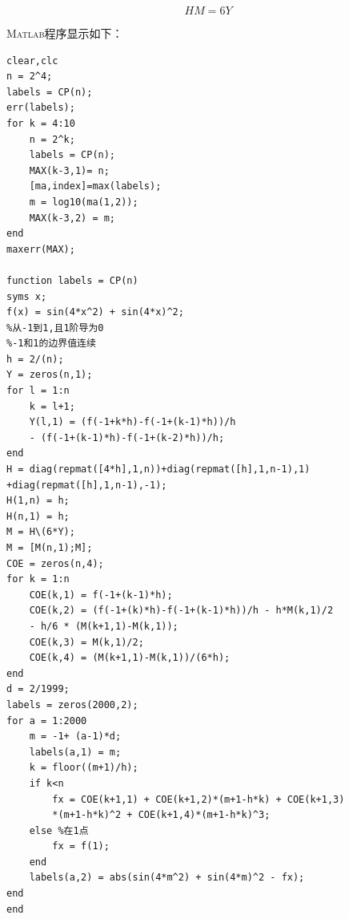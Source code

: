\documentclass[12pt,a4paper,UTF8]{ctexart}
\begin{document}
\begin{enumerate}
\begin{equation}
    HM = 6Y
\end{equation}

\textsc{Matlab}程序显示如下：
\begin{lstlisting}[frame=single]
clear,clc
n = 2^4;
labels = CP(n);
err(labels);
for k = 4:10
    n = 2^k;
    labels = CP(n);
    MAX(k-3,1)= n;
    [ma,index]=max(labels);
    m = log10(ma(1,2));
    MAX(k-3,2) = m;
end
maxerr(MAX);

function labels = CP(n)
syms x;
f(x) = sin(4*x^2) + sin(4*x)^2;
%从-1到1,且1阶导为0
%-1和1的边界值连续
h = 2/(n);
Y = zeros(n,1);
for l = 1:n
    k = l+1;
    Y(l,1) = (f(-1+k*h)-f(-1+(k-1)*h))/h 
    - (f(-1+(k-1)*h)-f(-1+(k-2)*h))/h;
end
H = diag(repmat([4*h],1,n))+diag(repmat([h],1,n-1),1)
+diag(repmat([h],1,n-1),-1);
H(1,n) = h;
H(n,1) = h;
M = H\(6*Y);
M = [M(n,1);M];
COE = zeros(n,4);
for k = 1:n
    COE(k,1) = f(-1+(k-1)*h);
    COE(k,2) = (f(-1+(k)*h)-f(-1+(k-1)*h))/h - h*M(k,1)/2 
    - h/6 * (M(k+1,1)-M(k,1));
    COE(k,3) = M(k,1)/2;
    COE(k,4) = (M(k+1,1)-M(k,1))/(6*h);
end
d = 2/1999;
labels = zeros(2000,2);
for a = 1:2000
    m = -1+ (a-1)*d;
    labels(a,1) = m;
    k = floor((m+1)/h);
    if k<n
        fx = COE(k+1,1) + COE(k+1,2)*(m+1-h*k) + COE(k+1,3)
        *(m+1-h*k)^2 + COE(k+1,4)*(m+1-h*k)^3;
    else %在1点
        fx = f(1);
    end
    labels(a,2) = abs(sin(4*m^2) + sin(4*m)^2 - fx);
end
end


\end{lstlisting}
\end{enumerate}
\end{document}
